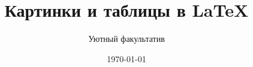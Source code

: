 \documentclass[12pt, a4paper]{article}
\author{Уютный факультатив}
\title{Картинки и таблицы в \LaTeX}
\date{\today}
\begin{document}
 

\maketitle

\begin{figure}[H]
\begin{minipage}[h]{0.3\linewidth}
\end{minipage}
\hfill
\begin{minipage}[h]{0.3\linewidth}

\end{minipage}
\end{figure}
\end{document}
